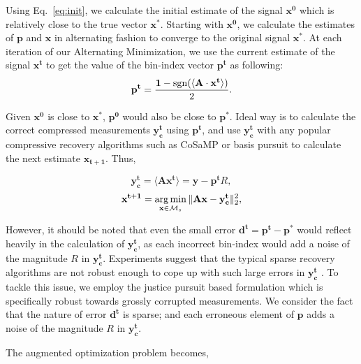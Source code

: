 Using Eq.~\ref{eq:init}, we calculate the initial estimate of the signal $\mathbf{{x}^0}$ which is relatively close to the true vector $\mathbf{x^*}$. Starting with $\mathbf{{x}^0}$, we  calculate the estimates of $\mathbf{p}$ and $\mathbf{x}$ in alternating fashion to converge to the original signal $\mathbf{x^*}$. At each iteration of our Alternating Minimization, we use the current estimate of the signal ${\mathbf{x^t}}$ to get the value of the bin-index vector $\mathbf{{p}^t}$ as following:
\begin{equation}
\mathbf{{p}^{t}} = \frac{\mathbf{1}-\mathrm{sgn}(\langle \mathbf{A} \cdot \mathbf{x^t} \rangle)}{2}.
\label{step1}
\end{equation}


Given $\mathbf{x^0}$ is close to $\mathbf{x^*}$, $\mathbf{p^0}$ would also be close to $\mathbf{p^*}$. Ideal way is to calculate the correct compressed measurements $\mathbf{y^t_c}$ using $\mathbf{p^t}$, and use $\mathbf{y^t_c}$ with any popular compressive recovery algorithms such as CoSaMP or basis pursuit to calculate the next estimate $\mathbf{{x}_{t+1}}$. Thus,


$$
\mathbf{y^t_c} = \langle \mathbf{A}\mathbf{x^{t}} \rangle = \mathbf{y} - \mathbf{p^t}R,
$$
$$
\mathbf{{x}^{t+1}} = \argmin_{\mathbf{x} \in \mathcal{M}_s}\norm{\mathbf{Ax} - \mathbf{y^t_c}}_2^2, %
$$



However, it should be noted that even the small error $\mathbf{d^t} = \mathbf{p^t - p^*}$ would reflect heavily in the calculation of $\mathbf{y^t_c}$, as each incorrect bin-index would add a noise of the magnitude $R$ in $\mathbf{y^t_c}$. Experiments suggest that the typical sparse recovery algorithms are not robust enough to cope up with such large errors in $\mathbf{y^t_c}$ \cite{Laska2009}. To tackle this issue, we employ the justice pursuit based formulation which is specifically robust towards grossly corrupted measurements. We consider the fact that the nature of error $\mathbf{d^t}$ is sparse; and each erroneous element of $\mathbf{p}$ adds a noise of the magnitude $R$ in $\mathbf{y^t_c}$.

The augmented optimization problem becomes,

